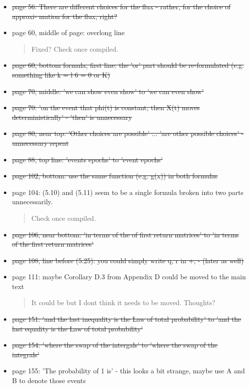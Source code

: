\documentclass[a4paper]{article}
\begin{document}
\begin{itemize}
\begin{quote}
\end{quote}
\item \st{page 56: There are different choices for the flux - rather, for the choice of approxi-
mation for the flux, right?}
\item page 60, middle of page: overlong line
\begin{quote}
    Fixed? Check once compiled.
\end{quote}
\item \st{page 60, bottom formula, first line: the 'or' part should be re-formulated (e.g.
something like k = l 6 = 0 or K)}
\item \st{page 70, middle: 'we can show even show' to 'we can even show'}
\item \st{page 70: 'on the event that phi(t) is constant, then X(t) moves deterministically' -
'then' is unnecessary}
\item \st{page 80, near top: 'Other choices are possible' ... 'are other possible choices' -
unnecessary repeat}
\item \st{page 88, top line: 'events epochs' to 'event epochs'}
\item \st{page 102, bottom: use the same function (e.g. g(x)) in both formulas}
\item page 104: (5.10) and (5.11) seem to be a single formula broken into two parts
unnecessarily.
\begin{quote}
    Check once compiled.
\end{quote}
\item \st{page 106, near bottom: 'in terms of the of first return matrices' to 'in terms of the
first return matrices'}
\item \st{page 108, line before (5.25): you could simply write q, r in +, - (later as well)}
\item page 111: maybe Corollary D.3 from Appendix D could be moved to the main text
\begin{quote}
    It could be but I dont think it needs to be moved. Thoughts?
\end{quote}
\item \st{page 151: 'and the last inequality is the Law of total probability' to 'and the last
equality is the Law of total probability'}
\item \st{page 154: 'where the swap of the intergals' to 'where the swap of the integrals'}
\item page 155: 'The probability of 1 is' - this looks a bit strange, maybe use A and B to
denote those events
\begin{quote}

\end{quote}
\end{itemize}
\end{document}
